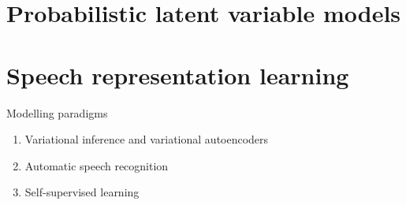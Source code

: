 





\section{Probabilistic latent variable models}




\section{Speech representation learning}




\iffalse


Modelling paradigms
\begin{enumerate}
    \item Variational inference and variational autoencoders
    \item Automatic speech recognition
    \item Self-supervised learning
\end{enumerate}

